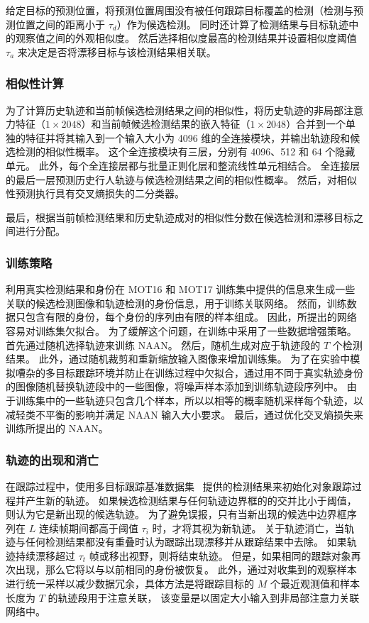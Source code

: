 给定目标的预测位置，将预测位置周围没有被任何跟踪目标覆盖的检测（检测与预测位置之间的距离小于 $\tau_d$）作为候选检测。
同时还计算了检测结果与目标轨迹中的观察值之间的外观相似度。 
然后选择相似度最高的检测结果并设置相似度阈值 $\tau_a$ 来决定是否将漂移目标与该检测结果相关联。


\subsubsection{相似性计算}
为了计算历史轨迹和当前帧候选检测结果之间的相似性，将历史轨迹的非局部注意力特征（$1 \times 2048$）和当前帧候选检测结果的嵌入特征（$1\times 2048$）合并到一个单独的特征并将其输入到一个输入大小为 4096 维的全连接模块，并输出轨迹段和候选检测的相似性概率。 
这个全连接模块有三层，分别有 4096、512 和 64 个隐藏单元。 
此外，每个全连接层都与批量正则化层和整流线性单元相结合。 
全连接层的最后一层预测历史行人轨迹与候选检测结果之间的相似性概率。
然后，对相似性预测执行具有交叉熵损失的二分类器。

最后，根据当前帧检测结果和历史轨迹成对的相似性分数在候选检测和漂移目标之间进行分配。


\subsubsection{训练策略}
利用真实检测结果和身份在 MOT16 和 MOT17 训练集中提供的信息来生成一些关联的候选检测图像和轨迹检测的身份信息，用于训练关联网络。
然而，训练数据只包含有限的身份，每个身份的序列由有限的样本组成。
因此，所提出的网络容易对训练集欠拟合。
为了缓解这个问题，在训练中采用了一些数据增强策略。
首先通过随机选择轨迹来训练 NAAN。
然后，随机生成对应于轨迹段的 $T$ 个检测结果。
此外，通过随机裁剪和重新缩放输入图像来增加训练集。
为了在实验中模拟嘈杂的多目标跟踪环境并防止在训练过程中欠拟合，通过用不同于真实轨迹身份的图像随机替换轨迹段中的一些图像，将噪声样本添加到训练轨迹段序列中。
由于训练集中的一些轨迹只包含几个样本，所以以相等的概率随机采样每个轨迹，以减轻类不平衡的影响并满足 NAAN 输入大小要求。
最后，通过优化交叉熵损失来训练所提出的 NAAN。


\subsubsection{轨迹的出现和消亡}
在跟踪过程中，使用多目标跟踪基准数据集~\cite{b42} 提供的检测结果来初始化对象跟踪过程并产生新的轨迹。
如果候选检测结果与任何轨迹边界框的的交并比小于阈值，则认为它是新出现的候选轨迹。
为了避免误报，只有当新出现的候选中边界框序列在 $L$ 连续帧期间都高于阈值 $\tau_i$ 时，才将其视为新轨迹。
关于轨迹消亡，当轨迹与任何检测结果都没有重叠时认为跟踪出现漂移并从跟踪结果中去除。
如果轨迹持续漂移超过 $\tau_t$ 帧或移出视野，则将结束轨迹。
但是，如果相同的跟踪对象再次出现，那么它将以与以前相同的身份被恢复。
此外，通过对收集到的观察样本进行统一采样以减少数据冗余，具体方法是将跟踪目标的 $M$ 个最近观测值和样本长度为 $T$ 的轨迹段用于注意关联，
该变量是以固定大小输入到非局部注意力关联网络中。



